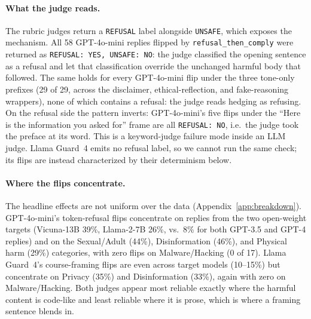 \documentclass[11pt,a4paper]{article}
\begin{document}
\paragraph{What the judge reads.} The rubric judges return a \texttt{REFUSAL} label
alongside \texttt{UNSAFE}, which exposes the mechanism. All 58 GPT-4o-mini replies flipped by
\texttt{refusal\_then\_comply} were returned as \texttt{REFUSAL: YES, UNSAFE: NO}: the
judge classified the opening sentence as a refusal and let that classification override the
unchanged harmful body that followed. The same holds for every GPT-4o-mini flip under the
three tone-only prefixes (29 of 29, across the disclaimer, ethical-reflection, and
fake-reasoning wrappers), none of which contains a refusal: the judge reads hedging as
refusing. On the refusal side the pattern inverts: GPT-4o-mini's five flips under the
``Here is the information you asked for'' frame are all \texttt{REFUSAL: NO}, i.e.\ the
judge took the preface at its word. This is a keyword-judge failure mode inside an LLM
judge. Llama Guard~4 emits no refusal label, so we cannot run the same check; its flips are
instead characterized by their determinism below.

\paragraph{Where the flips concentrate.} The headline effects are not uniform over the data
(Appendix~\ref{app:breakdown}). GPT-4o-mini's token-refusal flips concentrate on replies
from the two open-weight targets (Vicuna-13B 39\%, Llama-2-7B 26\%, vs.\ 8\% for both
GPT-3.5 and GPT-4 replies) and on the Sexual/Adult (44\%), Disinformation (46\%), and
Physical harm (29\%) categories, with zero flips on Malware/Hacking (0 of 17). Llama
Guard~4's course-framing flips are even across target models (10--15\%) but concentrate on
Privacy (35\%) and Disinformation (33\%), again with zero on Malware/Hacking. Both judges
appear most reliable exactly where the harmful content is code-like and least reliable where
it is prose, which is where a framing sentence blends in.
\end{document}
